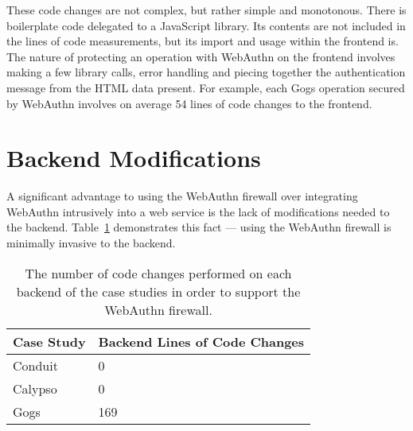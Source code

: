 These code changes are not complex, but rather simple and monotonous. There is boilerplate code delegated to a JavaScript library. Its contents are not included in the lines of code measurements, but its import and usage within the frontend is. The nature of protecting an operation with WebAuthn on the frontend involves making a few library calls, error handling and piecing together the authentication message from the HTML data present. For example, each Gogs operation secured by WebAuthn involves on average 54 lines of code changes to the frontend. 




\section{Backend Modifications}\label{Sec:BackendModifications}

A significant advantage to using the WebAuthn firewall over integrating WebAuthn intrusively into a web service is the lack of modifications needed to the backend. Table~\ref{Table:EvaluationsBackendModifications} demonstrates this fact --- using the WebAuthn firewall is minimally invasive to the backend.

\begin{table}[h]
\centering

\begin{tabular}{ m{4.5cm} m{6cm}  } 
 \hline
 Case Study & Backend Lines of Code Changes \\ 
 \hline \hline

 Conduit & 0 \\ \hline

 Calypso & 0 \\ \hline

 Gogs & 169 \\ \hline

\end{tabular}
\caption{The number of code changes performed on each backend of the case studies in order to support the WebAuthn firewall.}
\label{Table:EvaluationsBackendModifications}
\end{table}

